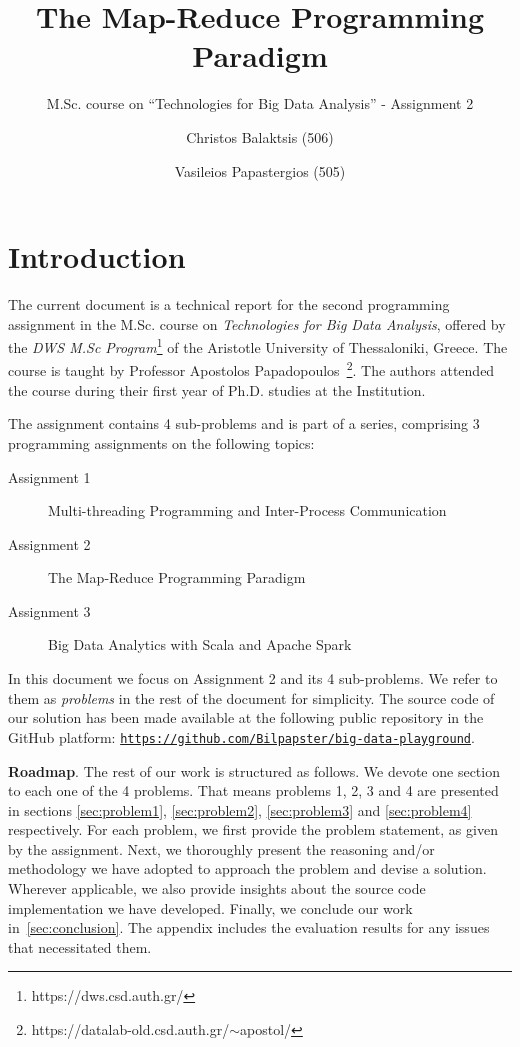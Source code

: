 \documentclass[acmlarge]{acmart}
\begin{document}
\title{The Map-Reduce Programming Paradigm}
\subtitle{M.Sc. course on ``Technologies for Big Data Analysis'' - Assignment 2}

\author{Christos Balaktsis (506)}
\author{Vasileios Papastergios (505)}

\renewcommand{\shortauthors}{C. Balaktsis and V. Papastergios}
\maketitle

\section{Introduction}

The current document is a technical report for the second programming assignment in the M.Sc. course on
\emph{Technologies for Big Data Analysis}, offered by the \emph{DWS M.Sc Program}\footnote{https://dws.csd.auth.gr/} of the Aristotle University of Thessaloniki, Greece. The course is taught by Professor Apostolos Papadopoulos~\footnote{https://datalab-old.csd.auth.gr/$\sim$apostol/}. The authors attended the course during their first year of Ph.D. studies at the Institution.

The assignment contains 4 sub-problems and is part of a series, comprising 3 programming assignments on the following topics:
\begin{description}
  \item[Assignment 1] Multi-threading Programming and Inter-Process Communication
  \item[Assignment 2] The Map-Reduce Programming Paradigm
  \item[Assignment 3] Big Data Analytics with Scala and Apache Spark
\end{description}
In this document we focus on Assignment 2 and its 4 sub-problems.
We refer to them as \emph{problems} in the rest of the document for simplicity.
The source code of our solution has been made available at the following public repository in the GitHub platform: \href{https://github.com/Bilpapster/big-data-playground}{\texttt{\small https://github.com/Bilpapster/big-data-playground}}.

\textbf{Roadmap}.
The rest of our work is structured as follows.
We devote one section to each one of the 4 problems.
That means problems 1, 2, 3 and 4 are presented in sections \ref{sec:problem1}, \ref{sec:problem2}, \ref{sec:problem3} and \ref{sec:problem4} respectively.
For each problem, we first provide the problem statement, as given by the assignment.
Next, we thoroughly present the reasoning and/or methodology we have adopted to approach the problem and devise a solution.
Wherever applicable, we also provide insights about the source code implementation we have developed.
Finally, we conclude our work in~\autoref{sec:conclusion}.
The appendix includes the evaluation results for any issues that necessitated them.
\end{document}
